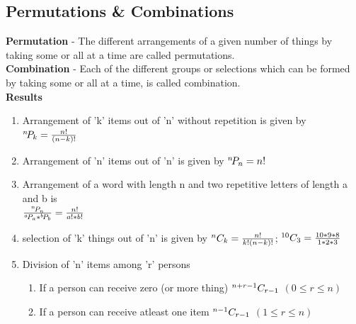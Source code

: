\subsection{Permutations \& Combinations}
\textbf{Permutation} - The different arrangements of a given number of things by taking some or all at a time are called permutations.\\
\textbf{Combination} - Each of the different groups or selections which can be formed by taking some or all at a time, is called combination.\vspace{0.2cm}\\
\textbf{Results}
\begin{enumerate}
    \item Arrangement of 'k' items out of 'n' without repetition is given by\\
    ${}^{n}\!P_{k}=\frac{n!}{(n-k)!}$
    \item Arrangement of 'n' items out of 'n' is given by
    ${}^{n}\!P_{n}=n!$
    \item Arrangement of a word with length n and two repetitive letters of length a and b is\\
    $\frac{{}^{n}\!P_{n}}{{}^{a}\!P_{a}*{}^{b}\!P_{b}}=\frac{n!}{a!*b!}$
    \item selection of 'k' things out of 'n' is given by
    ${}^{n}C_{k}=\frac{n!}{k!(n-k)!}$;  ${}^{10}C_{3}=\frac{10*9*8}{1*2*3}$
    \item Division of 'n' items among 'r' persons
        \begin{enumerate}
            \item If a person can receive zero (or more thing) ${}^{n+r-1}C_{r-1}$ \((0\leq r\leq n)\)
            \item If a person can receive atleast one item ${}^{n-1}C_{r-1}$ \((1\leq r\leq n)\)
        \end{enumerate}
\end{enumerate}



